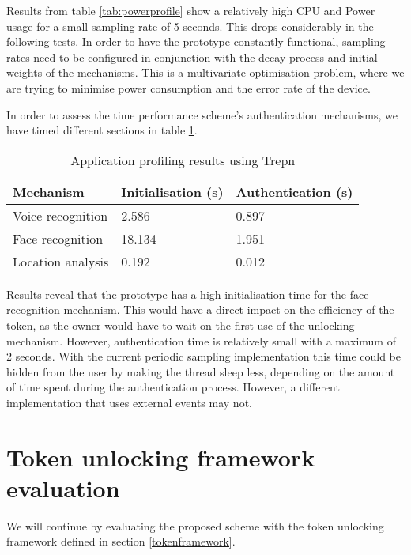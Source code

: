 Results from table \ref{tab:powerprofile} show a relatively high CPU and Power usage for a small sampling rate of 5 seconds. This drops considerably in the following tests. In order to have the prototype constantly functional, sampling rates need to be configured in conjunction with the decay process and initial weights of the mechanisms. This is a multivariate optimisation problem, where we are trying to minimise power consumption and the error rate of the device.

In order to assess the time performance scheme's authentication mechanisms, we have timed different sections in table \ref{tab:timeprofile}.
\begin{table}
    \begin{tabular}{l|l|l}
		Mechanism         & Initialisation (s) 	& Authentication (s) \\ \hline
		Voice recognition & 2.586	            & 0.897          \\
		Face recognition  & 18.134        		& 1.951          \\
		Location analysis & 0.192          		& 0.012          \\
    \end{tabular}
	\caption{Application profiling results using Trepn}
	\label{tab:timeprofile}
\end{table}

Results reveal that the prototype has a high initialisation time for the face recognition mechanism. This would have a direct impact on the efficiency of the token, as the owner would have to wait on the first use of the unlocking mechanism. However, authentication time is relatively small with a maximum of 2 seconds. With the current periodic sampling implementation this time could be hidden from the user by making the thread sleep less, depending on the amount of time spent during the authentication process. However, a different implementation that uses external events may not.

\section{Token unlocking framework evaluation}
We will continue by evaluating the proposed scheme with the token unlocking framework defined in section \ref{tokenframework}.

